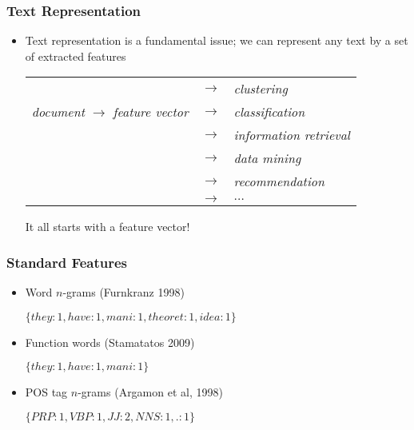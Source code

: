 \documentclass[handouti]{beamer}
\begin{document}
\begin{frame}
    \frametitle{Text Representation}
    \begin{itemize}
        \itemsep1.5em
        \item[] Text representation is a fundamental issue; we can represent any
            text by a set of extracted features

        \vspace{.5in}
        {\normalsize
        \begin{tabular}{ccl}
            & $\rightarrow$ & \emph{clustering} \\
            \emph{document} $\rightarrow$ \emph{feature vector} & $\rightarrow$
            & \emph{classification} \\
            & $\rightarrow$ & \emph{information retrieval} \\
            & $\rightarrow$ & \emph{data mining} \\
            & $\rightarrow$ & \emph{recommendation} \\
            & $\rightarrow$ & $\ldots$\\
        \end{tabular}}

        \vspace{.3in}
        \begin{center}
        It all starts with a feature vector!
        \end{center}
    \end{itemize}
\end{frame}

\begin{frame}[fragile]
    \frametitle{Standard Features}
    \begin{itemize}
        \itemsep1.5em
        \item Word $n$-grams {\normalsize (Furnkranz 1998) }
                \begin{center}
                {\normalsize
                $\{ they:1,  have:1,  mani:1,  theoret:1,  idea:1  \}$
                }
                \end{center}
            \item Function words {\normalsize (Stamatatos 2009)}
                \begin{center}
                {\normalsize
                    $\{ they:1, have:1, mani:1 \}$
                }
                \end{center}
            \item POS tag $n$-grams {\normalsize (Argamon et al, 1998)}
                \begin{center}
                {\normalsize
                    $\{ PRP:1, VBP:1, JJ:2, NNS:1, .:1 \}$
                }
                \end{center}
     \end{itemize}
\end{frame}
\end{document}
